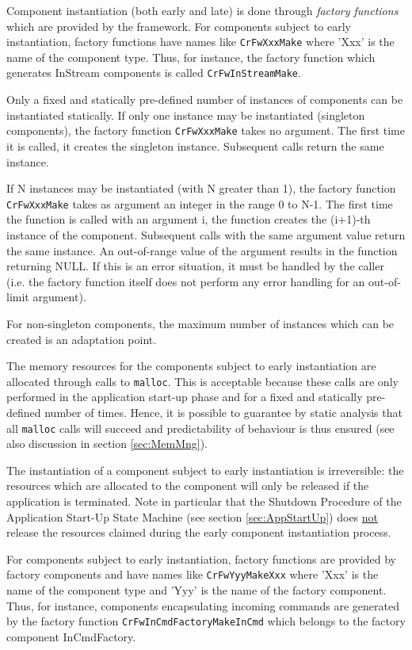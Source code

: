 \documentclass[a4paper,10pt]{article}
\begin{document}
Component instantiation (both early and late) is done through \textit{factory functions} which are provided by the framework. For components subject to early instantiation, factory functions have names like \texttt{CrFwXxxMake} where 'Xxx' is the name of the component type. Thus, for instance, the factory function which generates InStream components is called \texttt{CrFwInStreamMake}.  

Only a fixed and statically pre-defined number of instances of components can be instantiated statically. If only one instance may be instantiated (singleton components), the factory function \texttt{CrFwXxxMake} takes no argument. The first time it is called, it creates the singleton instance. Subsequent calls return the same instance.

If N instances may be instantiated (with N greater than 1), the factory function \texttt{CrFwXxxMake} takes as argument an integer in the range 0 to N-1. The first time the function is called with an argument i, the function creates the (i+1)-th instance of the component. Subsequent calls with the same argument value return the same instance. An out-of-range value of the argument results in the function returning NULL. If this is an error situation, it must be handled by the caller (i.e. the factory function itself does not perform any error handling for an out-of-limit argument).

For non-singleton components, the maximum number of instances which can be created is an adaptation point.

The memory resources for the components subject to early instantiation are allocated through calls to \texttt{malloc}. This is acceptable because these calls are only performed in the application start-up phase and for a fixed and statically pre-defined number of times. Hence, it is possible to guarantee by static analysis that all \texttt{malloc} calls will succeed and predictability of behaviour is thus ensured (see also discussion in section \ref{sec:MemMng}).

The instantiation of a component subject to early instantiation is irreversible: the resources which are allocated to the component will only be released if the application is terminated. Note in particular that the Shutdown Procedure of the Application Start-Up State Machine (see section \ref{sec:AppStartUp}) does \underline{not} release the resources claimed during the early component instantiation process. 

For components subject to early instantiation, factory functions are provided by factory components and have names like \texttt{CrFwYyyMakeXxx} where 'Xxx' is the name of the component type and 'Yyy' is the name of the factory component. Thus, for instance, components encapsulating incoming commands are generated by the factory function \texttt{CrFwInCmdFactoryMakeInCmd} which belongs to the factory component InCmdFactory.  
\end{document}
